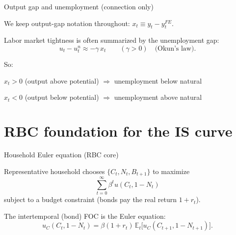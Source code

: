 \documentclass[aspectratio=169,xcolor=dvipsnames]{beamer}
\let\tempone\itemize
\let\temptwo\enditemize
\renewenvironment{itemize}{\tempone\addtolength{\itemsep}{\fill}}{\temptwo}
\begin{document}
\begin{frame}{Output gap and unemployment (connection only)}
\begin{itemize}
\item We keep output-gap notation throughout: $x_t \equiv y_t - y_t^{FE}$.
\item Labor market tightness is often summarized by the unemployment gap:
\[
u_t - u_t^{n} \approx -\gamma \, x_t \qquad (\gamma>0)\quad \text{(Okun's law)}.
\]
\item So:
\begin{itemize}
\item $x_t>0$ (output above potential) $\Rightarrow$ unemployment below natural
\item $x_t<0$ (output below potential) $\Rightarrow$ unemployment above natural
\end{itemize}
\end{itemize}
\end{frame}




\section[RBC $\rightarrow $ IS]{RBC foundation for the IS curve}

\begin{frame}{Household Euler equation (RBC core)}
\small
\begin{itemize}
\item Representative household chooses $\{C_t,N_t,B_{t+1}\}$ to maximize
\[
\sum_{t=0}^\infty \beta^t u(C_t,1-N_t)
\]
subject to a budget constraint (bonds pay the real return $1+r_t$).
\item The intertemporal (bond) FOC is the Euler equation:
\[
u_C(C_t,1-N_t)=\beta(1+r_t)\,\mathbb{E}_t\big[u_C(C_{t+1},1-N_{t+1})\big].
\]
\end{itemize}
\end{frame}

\end{document}
